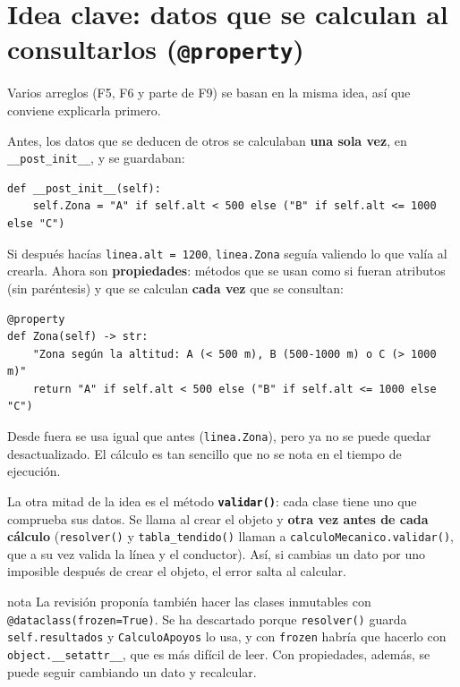 \documentclass[11pt,a4paper]{article}
\newcommand{\code}[1]{\texttt{#1}}
\begin{document}
\section{\texorpdfstring{Idea clave: datos que se calculan al consultarlos (\code{@property})}{Idea clave: datos que se calculan al consultarlos (@property)}}
\label{sec:property}

Varios arreglos (F5, F6 y parte de F9) se basan en la misma idea, así que conviene explicarla primero.

Antes, los datos que se deducen de otros se calculaban \textbf{una sola vez}, en \code{\_\_post\_init\_\_}, y se guardaban:

\begin{lstlisting}
def __post_init__(self):
    self.Zona = "A" if self.alt < 500 else ("B" if self.alt <= 1000 else "C")
\end{lstlisting}

Si después hacías \code{linea.alt = 1200}, \code{linea.Zona} seguía valiendo lo que valía al crearla. Ahora son \textbf{propiedades}: métodos que se usan como si fueran atributos (sin paréntesis) y que se calculan \textbf{cada vez} que se consultan:

\begin{lstlisting}
@property
def Zona(self) -> str:
    "Zona según la altitud: A (< 500 m), B (500-1000 m) o C (> 1000 m)"
    return "A" if self.alt < 500 else ("B" if self.alt <= 1000 else "C")
\end{lstlisting}

Desde fuera se usa igual que antes (\code{linea.Zona}), pero ya no se puede quedar desactualizado. El cálculo es tan sencillo que no se nota en el tiempo de ejecución.

La otra mitad de la idea es el método \textbf{\code{validar()}}: cada clase tiene uno que comprueba sus datos. Se llama al crear el objeto y \textbf{otra vez antes de cada cálculo} (\code{resolver()} y \code{tabla\_tendido()} llaman a \code{calculoMecanico.validar()}, que a su vez valida la línea y el conductor). Así, si cambias un dato por uno imposible después de crear el objeto, el error salta al calcular.

\begin{caja}[title=Por qué no \code{frozen=True}]{nota}
La revisión proponía también hacer las clases inmutables con \code{@dataclass(frozen=True)}. Se ha descartado porque \code{resolver()} guarda \code{self.resultados} y \code{CalculoApoyos} lo usa, y con \code{frozen} habría que hacerlo con \code{object.\_\_setattr\_\_}, que es más difícil de leer. Con propiedades, además, se puede seguir cambiando un dato y recalcular.
\end{caja}
\end{document}
